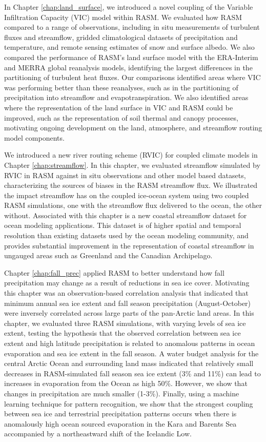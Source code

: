 In Chapter \ref{chap:land_surface}, we introduced a novel coupling of the Variable Infiltration Capacity (VIC) model within RASM.
We evaluated how RASM compared to a range of observations, including in situ measurements of turbulent fluxes and streamflow, gridded climatological datasets of precipitation and temperature, and remote sensing estimates of snow and surface albedo.
We also compared the performance of RASM's land surface model with the ERA-Interim and MERRA global reanalysis models, identifying the largest differences in the partitioning of turbulent heat fluxes.
Our comparisons identified areas where VIC was performing better than these reanalyses, such as in the partitioning of precipitation into streamflow and evapotranspiration.
We also identified areas where the representation of the land surface in VIC and RASM could be improved, such as the representation of soil thermal and canopy processes, motivating ongoing development on the land, atmosphere, and streamflow routing model components.

We introduced a new river routing scheme (RVIC) for coupled climate models in Chapter \ref{chap:streamflow}.
In this chapter, we evaluated streamflow simulated by RVIC in RASM against in situ observations and other model based datasets, characterizing the sources of biases in the RASM streamflow flux.
We illustrated the impact streamflow has on the coupled ice-ocean system using two coupled RASM simulations, one with the streamflow flux delivered to the ocean, the other without.
Associated with this chapter is a new coastal streamflow dataset for ocean modeling applications.
This dataset is of higher spatial and temporal resolution than existing datasets used by the ocean modeling community, and provides substantial improvement in the representation of coastal streamflow in ungauged areas such as Greenland and the Canadian Archipelago.

Chapter \ref{chap:fall_prec} applied RASM to better understand how fall precipitation may change as a result of reductions in sea ice cover.
Motivating this chapter was an observation-based correlation analysis that indicated that minimum annual sea ice extent and fall season precipitation (August-October) were inversely correlated across large parts of the pan-Arctic land areas.
In this chapter, we evaluated three RASM simulations, with varying levels of sea ice extent, testing the hypothesis that the observed correlation between sea ice extent and high latitude precipitation is related to anomalous patterns in ocean evaporation and sea ice extent in the fall season.
A water budget analysis for the central Arctic Ocean and surrounding land mass indicated that relatively small decreases in RASM-simulated fall season sea ice extent (3\% and 11\%) can lead to increases in evaporation from the Ocean as high 50\%.
However, we show that changes in precipitation are much smaller (1-3\%).
Finally, using a machine learning technique for pattern recognition, we show that the strongest coupling between sea ice and terrestrial precipitation patterns occurs when there is anomalously high ocean sourced evaporation in the Kara and Barents Sea accompanied by a northeastward shift of the Icelandic Low.

